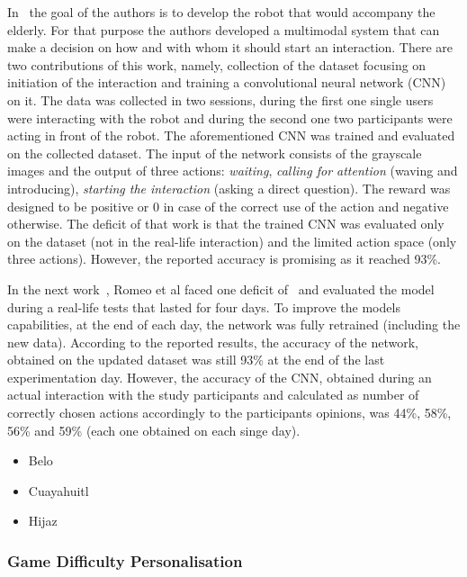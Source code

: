 \documentclass[thesis]{mas_proposal}
\begin{document}
In~\cite{Romeo2018} the goal of the authors is to develop the robot that would accompany the elderly. For that purpose the authors developed a multimodal system that can make a decision on how and with whom it should start an interaction. There are two contributions of this work, namely, collection of the dataset focusing on initiation of the interaction and training a convolutional neural network (CNN) on it. The data was collected in two sessions, during the first one single users were interacting with the robot and during the second one two participants were acting in front of the robot. The aforementioned CNN was trained and evaluated on the collected dataset. The input of the network consists of the grayscale images and the output of three actions: \emph{waiting}, \emph{calling for attention} (waving and introducing), \emph{starting the interaction} (asking a direct question). The reward  was designed to be positive or 0 in case of the correct use of the action and negative otherwise. The deficit of that work is that the trained CNN was evaluated only on the dataset (not in the real-life interaction) and the limited action space (only three actions). However, the reported accuracy is promising as it reached 93\%. 

In the next work~\cite{Romeo2019}, Romeo et al faced one deficit of~\cite{Romeo2018} and evaluated the model during a real-life tests that lasted for four days. To improve the models capabilities, at the end of each day, the network was fully retrained (including the new data). According to the reported results, the accuracy of the network, obtained on the updated dataset was still 93\% at the end of the last experimentation day. However, the accuracy of the CNN, obtained during an actual interaction with the study participants and calculated as number of correctly chosen actions accordingly to the participants opinions, was 44\%, 58\%, 56\% and 59\% (each one obtained on each singe day). \cite{romeo2021human}
\begin{itemize}
	\item Belo~\cite{Belo2021,Belo2022}
	\item Cuayahuitl~\cite{Cuayahuitl2017}
	\item Hijaz~\cite{Hijaz2021}
\end{itemize}

\subsubsection{Game Difficulty Personalisation}
\end{document}
